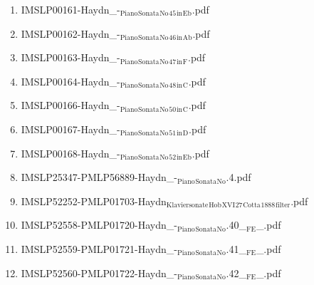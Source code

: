 \documentclass[11pt]{article}
\begin{document}
\begin{enumerate}
\begin{enumerate}
\item IMSLP00161-Haydn\_-$_{\text{Piano}}$$_{\text{Sonata}}$$_{\text{No}}$$_{\text{45}}$$_{\text{in}}$$_{\text{Eb}}$.pdf
\label{sec-1-1-1-1-44-38-4-40}

\item IMSLP00162-Haydn\_-$_{\text{Piano}}$$_{\text{Sonata}}$$_{\text{No}}$$_{\text{46}}$$_{\text{in}}$$_{\text{Ab}}$.pdf
\label{sec-1-1-1-1-44-38-4-41}

\item IMSLP00163-Haydn\_-$_{\text{Piano}}$$_{\text{Sonata}}$$_{\text{No}}$$_{\text{47}}$$_{\text{in}}$$_{\text{F}}$.pdf
\label{sec-1-1-1-1-44-38-4-42}

\item IMSLP00164-Haydn\_-$_{\text{Piano}}$$_{\text{Sonata}}$$_{\text{No}}$$_{\text{48}}$$_{\text{in}}$$_{\text{C}}$.pdf
\label{sec-1-1-1-1-44-38-4-43}

\item IMSLP00166-Haydn\_-$_{\text{Piano}}$$_{\text{Sonata}}$$_{\text{No}}$$_{\text{50}}$$_{\text{in}}$$_{\text{C}}$.pdf
\label{sec-1-1-1-1-44-38-4-44}

\item IMSLP00167-Haydn\_-$_{\text{Piano}}$$_{\text{Sonata}}$$_{\text{No}}$$_{\text{51}}$$_{\text{in}}$$_{\text{D}}$.pdf
\label{sec-1-1-1-1-44-38-4-45}

\item IMSLP00168-Haydn\_-$_{\text{Piano}}$$_{\text{Sonata}}$$_{\text{No}}$$_{\text{52}}$$_{\text{in}}$$_{\text{Eb}}$.pdf
\label{sec-1-1-1-1-44-38-4-46}

\item IMSLP25347-PMLP56889-Haydn\_-$_{\text{Piano}}$$_{\text{Sonata}}$$_{\text{No}}$.4.pdf
\label{sec-1-1-1-1-44-38-4-47}

\item IMSLP52252-PMLP01703-Haydn$_{\text{Klaviersonate}}$$_{\text{Hob}}$$_{\text{XVI}}$$_{\text{27}}$$_{\text{Cotta}}$$_{\text{1888}}$$_{\text{filter}}$.pdf
\label{sec-1-1-1-1-44-38-4-48}

\item IMSLP52558-PMLP01720-Haydn\_-$_{\text{Piano}}$$_{\text{Sonata}}$$_{\text{No}}$.40\_$_{\text{FE}}$\_.pdf
\label{sec-1-1-1-1-44-38-4-49}

\item IMSLP52559-PMLP01721-Haydn\_-$_{\text{Piano}}$$_{\text{Sonata}}$$_{\text{No}}$.41\_$_{\text{FE}}$\_.pdf
\label{sec-1-1-1-1-44-38-4-50}

\item IMSLP52560-PMLP01722-Haydn\_-$_{\text{Piano}}$$_{\text{Sonata}}$$_{\text{No}}$.42\_$_{\text{FE}}$\_.pdf
\label{sec-1-1-1-1-44-38-4-51}


\end{enumerate}
\end{enumerate}
\end{document}
